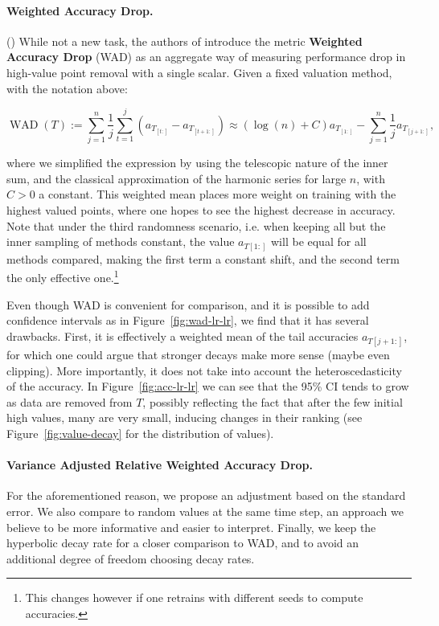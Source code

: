 \documentclass[10pt]{article}
\newcommand{\assign}{:=}
\newcommand{\tmdfn}[1]{\textbf{#1}}
\newcommand{\tmname}[1]{\textsc{#1}}
\newcommand{\tmop}[1]{\ensuremath{\operatorname{#1}}}
\begin{document}
\paragraph{Weighted Accuracy Drop.}() While not a new task, the
authors of {\cite{schoch_csshapley_2022}} introduce the metric
{\tmdfn{Weighted Accuracy Drop}} ({\tmname{WAD}}) as an aggregate way of
measuring performance drop in high-value point removal with a single scalar.
Given a fixed valuation method, with the notation above:

\begin{equation}
  \label{eq:wad} \tmop{WAD} (T) \assign \sum_{j = 1}^n \frac{1}{j}  \sum_{t =
  1}^j (a_{T_{[t :]}} - a_{T_{[t + 1 :]}}) \approx (\log (n) + C) a_{T_{[1
  :]}} - \sum_{j = 1}^n \frac{1}{j} a_{T_{[j + 1 :]}},
\end{equation}

where we simplified the expression by using the telescopic nature of the inner
sum, and the classical approximation of the harmonic series for large $n$,
with $C > 0$ a constant. This weighted mean places more weight on training
with the highest valued points, where one hopes to see the highest decrease in
accuracy. Note that under the third randomness scenario, i.e. when keeping all
but the inner sampling of methods constant, the value $a_{T [1 :]}$ will be
equal for all methods compared, making the first term a constant shift, and
the second term the only effective one.\footnote{This changes however if one
retrains with different seeds to compute accuracies.}

Even though WAD is convenient for comparison, and it is possible to add
confidence intervals as in  Figure~\ref{fig:wad-lr-lr}, we find that it has
several drawbacks. First, it is effectively a weighted mean of the tail
accuracies $a_{T [j + 1 :]}$, for which one could argue that stronger decays
make more sense (maybe even clipping). More importantly, it does not take into
account the heteroscedasticity of the accuracy. In  Figure~\ref{fig:acc-lr-lr}
we can see that the 95\% CI tends to grow as data are removed from $T$,
possibly reflecting the fact that after the few initial high values, many are
very small, inducing changes in their ranking (see
Figure~\ref{fig:value-decay} for the distribution of values).

\paragraph{Variance Adjusted Relative Weighted Accuracy Drop.}For the
aforementioned reason, we propose an adjustment based on the standard error.
We also compare to random values at the same time step, an approach we believe
to be more informative and easier to interpret. Finally, we keep the
hyperbolic decay rate for a closer comparison to WAD, and to avoid an
additional degree of freedom choosing decay rates.
\end{document}
